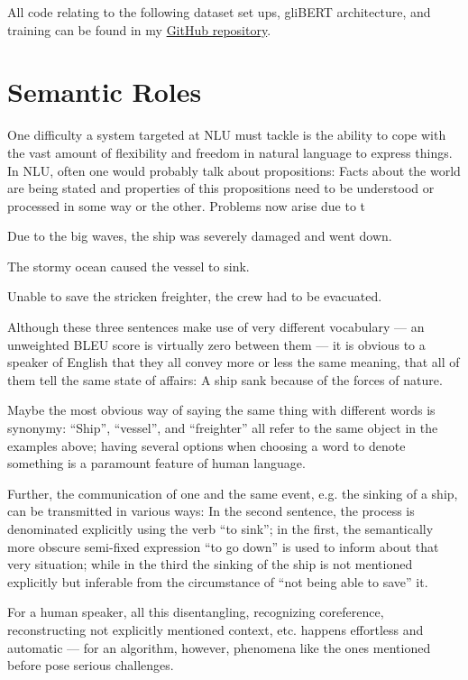 All code relating to the following dataset set ups, gliBERT architecture, and training can be found in
my \href{https://github.com/JonathanSchaber/Masterarbeit}{GitHub repository}.


\section{Semantic Roles}

One difficulty a system targeted at NLU must tackle is the ability to cope with the vast amount of
flexibility and freedom in natural language to express things. In NLU, often one would probably
talk about propositions: Facts about the world are being stated and properties of this propositions
need to be understood or processed in some way or the other.
{\color{red} Problems now arise due to t}

\begin{examples}
  \label{ex:semantics}
  \item Due to the big waves, the ship was severely damaged and went down.
  \item The stormy ocean caused the vessel to sink.
  \item Unable to save the stricken freighter, the crew had to be evacuated.
\end{examples}

Although these three sentences make use of very different vocabulary --- an unweighted BLEU score
is virtually zero between them --- it is obvious to a speaker of English that they all convey more
or less the same meaning, that all of them tell the same state of affairs: A ship sank because of the
forces of nature.

Maybe the most obvious way of saying the same thing with different words is synonymy: ``Ship'',
``vessel'', and ``freighter'' all refer to the same object in the examples above; having several
options when choosing a word to denote something is a paramount feature of human language.

Further, the communication of one and the same event, e.g. the sinking
of a ship, can be transmitted in various ways: In the second sentence,
the process is denominated explicitly using the verb ``to sink''; in
the first, the semantically more obscure semi-fixed expression ``to go
down'' is used to inform about that very situation; while in the third
the sinking of the ship is not mentioned explicitly but inferable from
the circumstance of ``not being able to save'' it.

For a human speaker, all this disentangling, recognizing coreference,
reconstructing not explicitly mentioned context, etc. happens effortless
and automatic --- for an algorithm, however, phenomena like the ones
mentioned before pose serious challenges.

